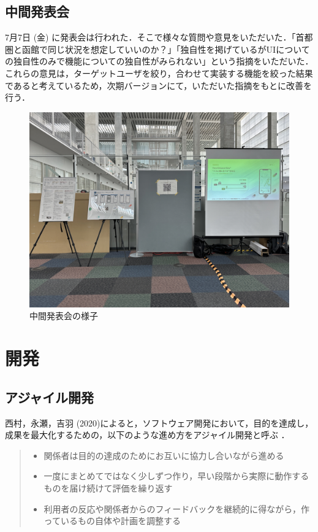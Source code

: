 \subsection{中間発表会}
7月7日 (金) に発表会は行われた．そこで様々な質問や意見をいただいた．「首都圏と函館で同じ状況を想定していいのか？」「独自性を掲げているがUIについての独自性のみで機能についての独自性がみられない」という指摘をいただいた．これらの意見は，ターゲットユーザを絞り，合わせて実装する機能を絞った結果であると考えているため，次期バージョンにて，いただいた指摘をもとに改善を行う．

\begin{figure}[H]
    \centering
    \includegraphics[width=12cm]{images/mid_presentation.png}
    \caption{中間発表会の様子}
    \label{fig:mid_presentation}
\end{figure}

\section{開発}
\subsection{アジャイル開発}
西村，永瀬，吉羽 (2020)によると，ソフトウェア開発において，目的を達成し，成果を最大化するための，以下のような進め方をアジャイル開発と呼ぶ \cite{scrum}．
\begin{quote}
    \begin{itemize}
        \item 関係者は目的の達成のためにお互いに協力し合いながら進める
        \item 一度にまとめてではなく少しずつ作り，早い段階から実際に動作するものを届け続けて評価を繰り返す
        \item 利用者の反応や関係者からのフィードバックを継続的に得ながら，作っているもの自体や計画を調整する
    \end{itemize}
\end{quote}

